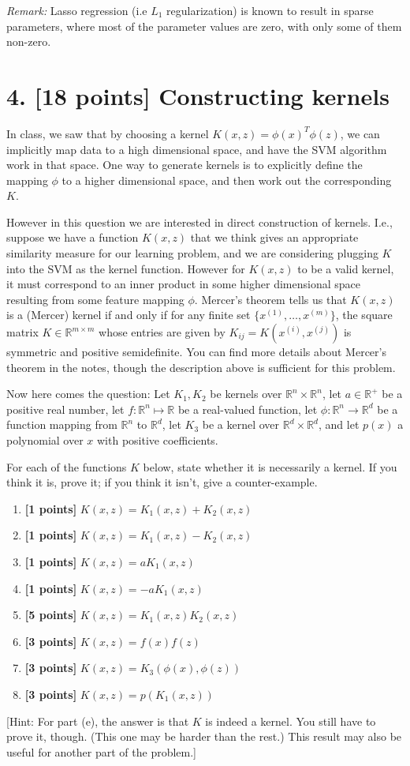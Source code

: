 \documentclass[11pt]{article}
\newcommand{\problem}[2]{\clearpage\section*{#1. #2}}
\newcommand{\R}{\mathbb{R}}
\begin{document}
\textit{Remark:} Lasso regression (i.e $L_1$ regularization) is known to result in sparse parameters, where most of the parameter values are zero, with only some of them non-zero.

\problem{4}{[18 points] Constructing kernels}
In class, we saw that by choosing a kernel $K(x,z)=\phi(x)^T\phi(z)$, we can implicitly map data to a high dimensional space, and have the SVM algorithm work in that space. One way to generate kernels is to explicitly define the mapping $\phi$ to a higher dimensional space, and then work out the corresponding $K$.

However in this question we are interested in direct construction of kernels. I.e., suppose we have a function $K(x,z)$ that we think gives an appropriate similarity measure for our learning problem, and we are considering plugging $K$ into the SVM as the kernel function. However for $K(x,z)$ to be a valid kernel, it must correspond to an inner product in some higher dimensional space resulting from some feature mapping $\phi$. Mercer's theorem tells us that $K(x,z)$ is a (Mercer) kernel if and only if for any finite set $\{x^{(1)},\ldots,x^{(m)}\}$, the square matrix $K\in\R^{m\times m}$ whose entries are given by $K_{ij}=K(x^{(i)},x^{(j)})$ is symmetric and positive semidefinite. You can find more details about Mercer's theorem in the notes, though the description above is sufficient for this problem.

Now here comes the question: Let $K_1,K_2$ be kernels over $\R^n\times\R^n$, let $a\in\R^+$ be a positive real number, let $f:\R^n\mapsto\R$ be a real-valued function, let $\phi:\R^n\to\R^d$ be a function mapping from $\R^n$ to $\R^d$, let $K_3$ be a kernel over $\R^d\times\R^d$, and let $p(x)$ a polynomial over $x$ with positive coefficients.

For each of the functions $K$ below, state whether it is necessarily a kernel. If you think it is, prove it; if you think it isn't, give a counter-example.
\begin{enumerate}
\item \textbf{[1 points]} $K(x,z)=K_1(x,z)+K_2(x,z)$
\item \textbf{[1 points]} $K(x,z)=K_1(x,z)-K_2(x,z)$
\item \textbf{[1 points]} $K(x,z)=aK_1(x,z)$
\item \textbf{[1 points]} $K(x,z)=-aK_1(x,z)$
\item \textbf{[5 points]} $K(x,z)=K_1(x,z)K_2(x,z)$
\item \textbf{[3 points]} $K(x,z)=f(x)f(z)$
\item \textbf{[3 points]} $K(x,z)=K_3(\phi(x),\phi(z))$
\item \textbf{[3 points]} $K(x,z)=p(K_1(x,z))$
\end{enumerate}
[Hint: For part (e), the answer is that $K$ is indeed a kernel. You still have to prove it, though. (This one may be harder than the rest.) This result may also be useful for another part of the problem.]
\end{document}
